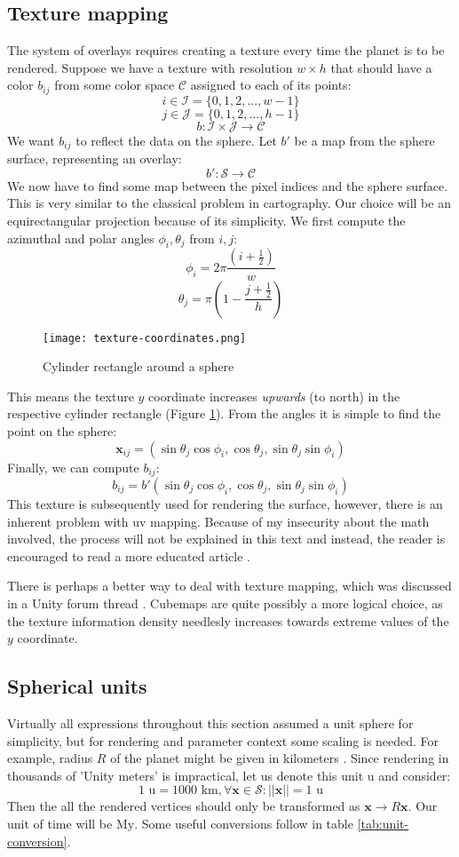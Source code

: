 \subsection{Texture mapping}
The system of overlays requires creating a texture every time the planet is to be rendered. Suppose we have a texture with resolution $w\times h$ that should have a color $b_{ij}$ from some color space $\mathcal{C}$ assigned to each of its points:
$$i\in\mathcal{I}=\{0,1,2,...,w-1\}$$
$$j\in\mathcal{J}=\{0,1,2,...,h-1\}$$
$$b:\mathcal{I}\times\mathcal{J}\rightarrow\mathcal{C}$$
We want $b_{ij}$ to reflect the data on the sphere. Let $b'$ be a map from the sphere surface, representing an overlay:
$$b': \mathcal{S}\rightarrow\mathcal{C}$$
We now have to find some map between the pixel indices and the sphere surface. This is very similar to the classical problem in cartography. Our choice will be an equirectangular projection because of its simplicity. We first compute the azimuthal and polar angles $\phi_i, \theta_j$ from $i,j$:
$$\phi_i = 2\pi\frac{\left(i+\frac{1}{2}\right)}{w}$$
$$\theta_j = \pi(1-\frac{j+\frac{1}{2}}{h})$$
\begin{figure}[ht]
\centering
\texttt{[image: texture-coordinates.png]}
\caption{Cylinder rectangle around a sphere}
\label{fig:rectangle-sphere}
\end{figure}
This means the texture $y$ coordinate increases \textit{upwards} (to north) in the respective cylinder rectangle (Figure \ref{fig:rectangle-sphere}). From the angles it is simple to find the point on the sphere:
$$\mathbf{x}_{ij} = (\sin\theta_j\cos\phi_i,\cos\theta_j,\sin\theta_j\sin\phi_i)$$
Finally, we can compute $b_{ij}$:
$$b_{ij}=b'(\sin\theta_j\cos\phi_i,\cos\theta_j,\sin\theta_j\sin\phi_i)$$
This texture is subsequently used for rendering the surface, however, there is an inherent problem with uv mapping. Because of my insecurity about the math involved, the process will not be explained in this text and instead, the reader is encouraged to read a more educated article \cite{bgolus}.

There is perhaps a better way to deal with texture mapping, which was discussed in a Unity forum thread \cite{unityforum}. Cubemaps are quite possibly a more logical choice, as the texture information density needlesly increases towards extreme values of the $y$ coordinate.
\subsection{Spherical units}
Virtually all expressions throughout this section assumed a unit sphere for simplicity, but for rendering and parameter context some scaling is needed. For example, radius $R$ of the planet might be given in kilometers \cite{cortial}. Since rendering in thousands of 'Unity meters' is impractical, let us denote this unit $\mbox{u}$ and consider:
$$1 \mbox{ u} = 1000\mbox{ km}, \forall\mathbf{x}\in\mathcal{S}:||\mathbf{x}|| = 1\mbox{ u}$$
Then the all the rendered vertices should only be transformed as $\mathbf{x}\rightarrow R\mathbf{x}$. Our unit of time will be $\mbox{My}$. Some useful conversions follow in table \ref{tab:unit-conversion}.

